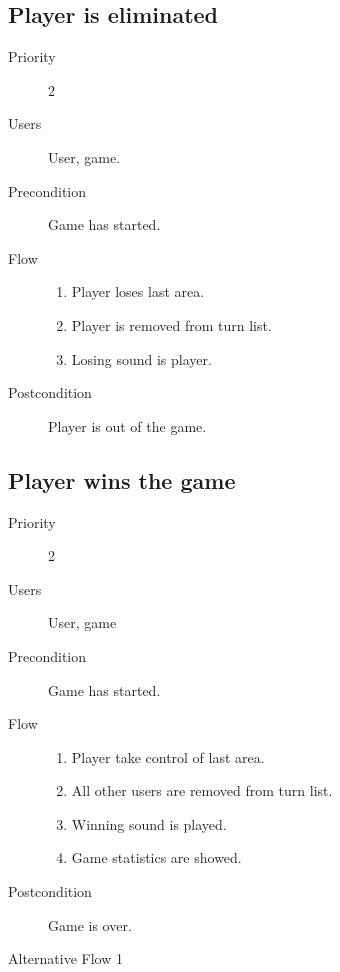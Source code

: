 \documentclass[12pt,a4paper]{article}
\begin{document}
\subsection{Player is eliminated}
\begin{description}
\item[Priority] 2
\item[Users] User, game.
\item[Precondition] Game has started.
\item[Flow]\mbox{}
  \begin{enumerate}
  \item Player loses last area.
  \item Player is removed from turn list.
  \item Losing sound is player.
  \end{enumerate}
\item[Postcondition] Player is out of the game.
\end{description}

\subsection{Player wins the game}
\begin{description}
\item[Priority] 2
\item[Users] User, game
\item[Precondition]  Game has started.
\item[Flow]\mbox{}
  \begin{enumerate}
  \item Player take control of last area.
  \item All other users are removed from turn list.
  \item Winning sound is played.
  \item Game statistics are showed.
  \end{enumerate}
\item[Postcondition] Game is over.
\item[Alternative Flow 1]\mbox{}
\end{description}
\end{document}
